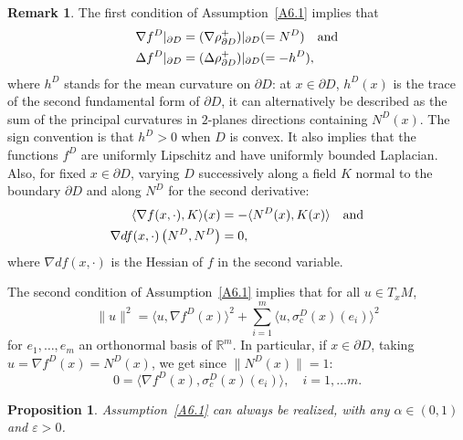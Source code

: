 \documentclass[10pt]{amsart}
\theoremstyle{plain}
\newtheorem{prop}[thm]{Proposition}
\theoremstyle{definition}
\newtheorem{remark}[thm]{Remark}
\newcommand{\RR}{{\mathbb R}}
\let\a\alpha
\let\e\varepsilon
\let\n\nabla
\let\s\sigma
\let\pa\partial
\begin{document}
\begin{remark}
The first condition of Assumption~\ref{A6.1} implies that
\begin{equation}
\label{6.2bis}
\begin{split}
\n f^D|_{\partial D}&=({\n \rho^{+}_{\partial D})}|_{\partial D}(=N^{D}) \quad\hbox{and}\\ \Delta f^D|_{\partial D}&=(\Delta {\rho^{+}_{\partial D})}|_{\partial D}(=-h^{D}),
\end{split}
\end{equation}
where $h^D$ stands for the mean curvature on $\pa D$: at $x\in\pa D$, $h^D(x)$ is the trace of the second fundamental form of $\pa D$, it can alternatively be described as the sum of the principal curvatures in $2$-planes directions containing $N^D(x)$. The sign convention is that $h^D>0$ when $D$ is convex.
It also implies that the functions $f^D$ are uniformly Lipschitz and have uniformly bounded Laplacian. Also, for fixed $x\in \partial D$, varying $D$ successively along a field $K$ normal to the boundary $\partial D$ and along $N^{D}$ for the second derivative:
\begin{equation}
\begin{split}
\langle \n f(x, \cdot ), K\rangle(x)&=-\langle N^{D}(x), K(x)\rangle \quad\hbox{and}\\ \n d f (x, \cdot)\left(N^{D},N^{D}\right)&=0,
\end{split}
\end{equation}
where $\n d f (x, \cdot)$ is the Hessian of $f$ in the second variable.

The second condition of Assumption~\ref{A6.1} implies that for all $u\in T_xM$,
\begin{equation}
\|u\|^2=\langle u,\n f^D(x)\rangle^2+ \sum_{i=1}^m\langle u,\s^D_{\mathrm c}(x)(e_i)\rangle^2
\end{equation}
for $e_1,\ldots,e_m$ an orthonormal basis of $\RR^m$. In particular, if $x\in \partial D$, taking $u=\n f^D(x)=N^D(x)$, we get since $\|N^D(x)\|=1$:
\begin{equation}
\label{6.4.2}
0=\langle \n f^D(x),\s_c^D(x)(e_i)\rangle, \quad i=1,\ldots m.
\end{equation}
\end{remark}
\begin{prop}
\label{P6.3}
Assumption~\ref{A6.1} can always be realized, with any $\a\in(0,1)$ and $\e>0$.
\end{prop}
\end{document}
